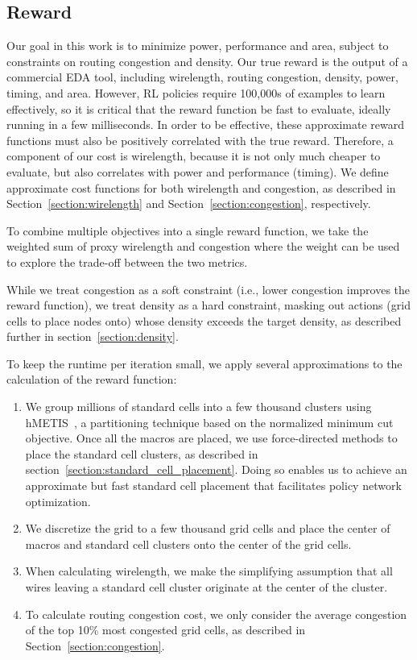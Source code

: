\documentclass{article}
\begin{document}
\subsection{Reward}\label{section:reward}
Our goal in this work is to minimize power, performance and area, subject to constraints on routing congestion and density. Our true reward is the output of a commercial EDA tool, including wirelength, routing congestion, density, power, timing, and area. However, RL policies require 100,000s of examples to learn effectively, so it is critical that the reward function be fast to evaluate, ideally running in a few milliseconds. In order to be effective, these approximate reward functions must also be positively correlated with the true reward. Therefore, a component of our cost is wirelength, because it is not only much cheaper to evaluate, but also correlates with power and performance (timing). We define approximate cost functions for both wirelength and congestion, as described in Section~\ref{section:wirelength} and Section~\ref{section:congestion}, respectively.

To combine multiple objectives into a single reward function, we take the weighted sum of proxy wirelength and congestion where the weight can be used to explore the trade-off between the two metrics.

While we treat congestion as a soft constraint (i.e., lower congestion improves the reward function), we treat density as a hard constraint, masking out actions (grid cells to place nodes onto) whose density exceeds the target density, as described further in section~\ref{section:density}.

To keep the runtime per iteration small, we apply several approximations to the calculation of the reward function: 

\begin{enumerate}
  \item We group millions of standard cells into a few thousand clusters using hMETIS~\cite{hmetis1998}, a partitioning technique based on the normalized minimum cut objective. Once all the macros are placed, we use force-directed methods to place the standard cell clusters, as described in section~\ref{section:standard_cell_placement}. Doing so enables us to achieve an approximate but fast standard cell placement that facilitates policy network optimization.
  \item We discretize the grid to a few thousand grid cells and place the center of macros and standard cell clusters onto the center of the grid cells.
  \item When calculating wirelength, we make the simplifying assumption that all wires leaving a standard cell cluster  originate at the center of the cluster.
  \item To calculate routing congestion cost, we only consider the average congestion of the top 10\% most congested grid cells, as described in Section~\ref{section:congestion}.
\end{enumerate}
\end{document}
